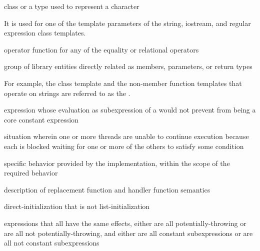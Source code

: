 %
class or a type used to
represent a character

\begin{defnote}
It is used for one of the template parameters of the string,
iostream, and regular expression class templates.
\end{defnote}

%
operator function for any of the equality or
relational operators

%
group of library entities directly related as members, parameters, or
return types

\begin{defnote}
For example, the class template
and the non-member
function templates
that operate on
strings are referred to as the
.
\end{defnote}

%
expression whose evaluation as subexpression of a
 would not prevent 
from being a core constant expression

%
situation wherein
one or more threads are unable to continue execution because each is
blocked waiting for one or more of the others to satisfy some condition

%
specific behavior provided by the implementation,
within the scope of the required behavior

%
description of replacement function and handler function
semantics

%
direct-initialization
that is not list-initialization

%
expressions that all have the same effects,
either
are all potentially-throwing or
are all not potentially-throwing,
and
either
are all constant subexpressions or
are all not constant subexpressions

